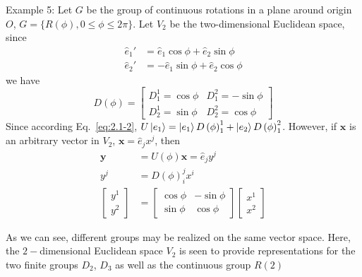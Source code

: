 \textrm{Example 5}: Let $G$ be the group of continuous rotations in a plane around origin $O$, $G=\{R\left(\phi\right), 0\leq \phi \leq 2\pi\}$.
Let $V_{2}$ be the two-dimensional Euclidean space, since
\begin{align}
  \label{eq:2.1-5}
  \hat{e}_{1}' &= \hat{e}_{1} \cos \phi + \hat{e}_{2} \sin \phi \\
  \hat{e}_{2}' &= -\hat{e}_{1} \sin \phi + \hat{e}_{2} \cos \phi \nonumber
\end{align}
we have
\begin{equation}
  \label{eq:2.1-6}
  D\left(\phi\right) =
  \begin{bmatrix}
    D_{1}^{1}=\cos \phi & D_{1}^{2}=-\sin \phi \\
    D_{2}^{1}=\sin \phi & D_{2}^{2}=\cos \phi
  \end{bmatrix}
\end{equation}
Since according Eq.~\eqref{eq:2.1-2}, $U \ket{e_{1}} = \ket{e_{1}} D\left(\phi\right)_{1}^{1}+ \ket{e_{2}} D\left(\phi\right)_{1}^{2}$.
However, if $\mathbf{x}$ is an arbitrary vector in $V_{2}$, $\mathbf{x} = \hat{e}_{j} x^{j}$, then
\begin{align}
  \label{eq:2.1-7}
  \mathbf{y} &= U\left(\phi\right) \mathbf{x} = \hat{e}_{j} y^{j} \\ \nonumber
  y^{j} &= D\left(\phi\right)^{j}_{i} x^{i} \\ \nonumber
  \begin{bmatrix}
    y^{1} \\
    y^{2}
  \end{bmatrix}
  &=
  \begin{bmatrix}
  \cos \phi & -\sin \phi \\
  \sin \phi & \cos \phi
  \end{bmatrix}
  \begin{bmatrix}
  x^{1}\\
  x^{2}
  \end{bmatrix}
\end{align}

As we can see, different groups may be realized on the same vector space.
Here, the $2-$dimensional Euclidean space $V_{2}$ is seen to provide representations for the two finite groups $D_{2}$, $D_{3}$ as well as the continuous group $R\left(2\right)$


